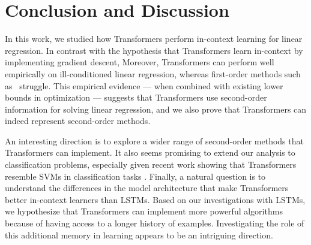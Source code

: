 \vspace{-1mm}
\section{Conclusion and Discussion}
\vspace{-1mm}

In this work, we studied how Transformers perform in-context learning for linear regression.
In contrast with the hypothesis that Transformers learn in-context by implementing gradient descent,
Moreover, Transformers can perform well empirically on ill-conditioned linear regression, whereas first-order methods such as \gd\ struggle. {This empirical evidence --- when combined with existing lower bounds in optimization --- suggests that Transformers use second-order information for solving linear regression, and we also prove that Transformers can indeed represent second-order methods. } 

An interesting direction is to explore a wider range of second-order methods that Transformers can implement. It also seems promising to  extend our analysis to classification problems, especially given 
recent work showing that Transformers resemble SVMs in classification tasks \citep{Li2023TransformersAA,AtaeeTarzanagh2023TransformersAS}. 
Finally, a natural question is to understand the differences in the  model architecture that make Transformers better in-context learners than LSTMs. Based on our investigations with LSTMs, we hypothesize that Transformers can implement more powerful algorithms because of having access to a longer history of examples. 
 Investigating the role of this additional memory in learning appears to be an intriguing direction.


